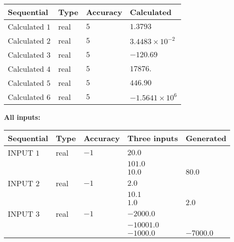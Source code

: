 \documentclass[12pt]{article}
\begin{document}
   
   
   
\noindent{}
   
   
  
  
\noindent\begin{tabular}{|l|l|l|l|}
\hline
 Sequential & Type & Accuracy & Calculated \\ 
\hline
 
 
  Calculated $            1 $ & real & $            5  $ & 
 $ 1.3793 $ 
 \\  \hline  
 
 
  Calculated $            2 $ & real & $            5  $ & 
 $ 3.4483 \times 10^{-2} $ 
 \\  \hline  
 
 
  Calculated $            3 $ & real & $            5  $ & 
 $ -120.69 $ 
 \\  \hline  
 
 
  Calculated $            4 $ & real & $            5  $ & 
 $ 17876. $ 
 \\  \hline  
 
 
  Calculated $            5 $ & real & $            5  $ & 
 $ 446.90 $ 
 \\  \hline  
 
 
  Calculated $            6 $ & real & $            5  $ & 
 $ -1.5641 \times 10^{6} $ 
 \\  \hline  
 \end{tabular}
   
   
   
   
\noindent\vspace{0.1in}\hspace{-0.08in} {\textbf{\Large{All inputs: }}}
   
   
  
  
\noindent\begin{tabular}{|l|l|l|l|l|}
\hline
 Sequential & Type & Accuracy & Three inputs & Generated \\ 
\hline
 
 
  INPUT $            1 $ & real & $           -1  $ & $
 20.0
  $ & \\
  & & &  $
 101.0
  $ & \\
  & & &  $
 10.0
 $ & $ 80.0 $ 
 \\  \hline  
 
 
  INPUT $            2 $ & real & $           -1  $ & $
 2.0
  $ & \\
  & & &  $
 10.1
  $ & \\
  & & &  $
 1.0
 $ & $ 2.0 $ 
 \\  \hline  
 
 
  INPUT $            3 $ & real & $           -1  $ & $
 -2000.0
  $ & \\
  & & &  $
 -10001.0
  $ & \\
  & & &  $
 -1000.0
 $ & $ -7000.0 $ 
 \\  \hline  
 \end{tabular}
   
\end{document}
